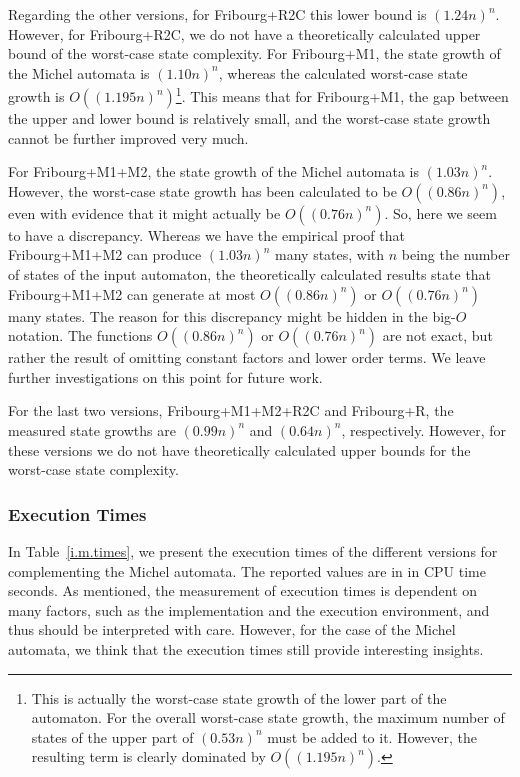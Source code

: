 Regarding the other versions, for Fribourg+R2C this lower bound is $(1.24n)^n$. However, for Fribourg+R2C, we do not have a theoretically calculated upper bound of the worst-case state complexity. For Fribourg+M1, the state growth of the Michel automata is $(1.10n)^n$, whereas the calculated worst-case state growth is $O((1.195n)^n)$\footnote{This is actually the worst-case state growth of the lower part of the automaton. For the overall worst-case state growth, the maximum number of states of the upper part of $(0.53n)^n$ must be added to it. However, the resulting term is clearly dominated by $O((1.195n)^n)$.}. This means that for Fribourg+M1, the gap between the upper and lower bound is relatively small, and the worst-case state growth cannot be further improved very much.

For Fribourg+M1+M2, the state growth of the Michel automata is $(1.03n)^n$. However, the worst-case state growth has been calculated to be $O((0.86n)^n)$, even with evidence that it might actually be $O((0.76n)^n)$. So, here we seem to have a discrepancy. Whereas we have the empirical proof that Fribourg+M1+M2 can produce $(1.03n)^n$ many states, with $n$ being the number of states of the input automaton, the theoretically calculated results state that Fribourg+M1+M2 can generate at most $O((0.86n)^n)$ or $O((0.76n)^n)$ many states. The reason for this discrepancy might be hidden in the big-$O$ notation. The functions $O((0.86n)^n)$ or $O((0.76n)^n)$ are not exact, but rather the result of omitting constant factors and lower order terms. We leave further investigations on this point for future work.

For the last two versions, Fribourg+M1+M2+R2C and Fribourg+R, the measured state growths are $(0.99n)^n$ and $(0.64n)^n$, respectively. However, for these versions we do not have theoretically calculated upper bounds for the worst-case state complexity.

\subsubsection{Execution Times}
In Table~\ref{i.m.times}, we present the execution times of the different versions for complementing the Michel automata. The reported values are in in CPU time seconds. As mentioned, the measurement of execution times is dependent on many factors, such as the implementation and the execution environment, and thus should be interpreted with care. However, for the case of the Michel automata, we think that the execution times still provide interesting insights.

